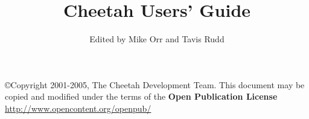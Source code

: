 \documentclass{howto}
\title{Cheetah Users' Guide}
\author{Edited by Mike Orr and Tavis Rudd}
\begin{document}
\maketitle


\tableofcontents

\copyright{Copyright 2001-2005, The Cheetah Development Team.
      This document may be copied and modified under the terms of the
      {\bf Open Publication License} \url{http://www.opencontent.org/openpub/} }

    
    
    
    
    
    
    
    
    
    
    
    
    
    
    
    
    
    
    

    \appendix
    
    
    
    
\end{document}
